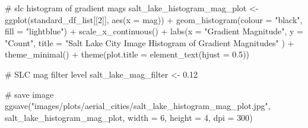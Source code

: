 \documentclass[
  letterpaper,
  DIV=11,
  numbers=noendperiod]{scrreprt}
\newenvironment{Shaded}{\begin{snugshade}}{\end{snugshade}}
\newcommand{\AttributeTok}[1]{\textcolor[rgb]{0.40,0.45,0.13}{#1}}
\newcommand{\CommentTok}[1]{\textcolor[rgb]{0.37,0.37,0.37}{#1}}
\newcommand{\DecValTok}[1]{\textcolor[rgb]{0.68,0.00,0.00}{#1}}
\newcommand{\FloatTok}[1]{\textcolor[rgb]{0.68,0.00,0.00}{#1}}
\newcommand{\FunctionTok}[1]{\textcolor[rgb]{0.28,0.35,0.67}{#1}}
\newcommand{\NormalTok}[1]{\textcolor[rgb]{0.00,0.23,0.31}{#1}}
\newcommand{\OtherTok}[1]{\textcolor[rgb]{0.00,0.23,0.31}{#1}}
\newcommand{\SpecialCharTok}[1]{\textcolor[rgb]{0.37,0.37,0.37}{#1}}
\newcommand{\StringTok}[1]{\textcolor[rgb]{0.13,0.47,0.30}{#1}}
\begin{document}
\begin{Shaded}
\begin{Highlighting}[]
\CommentTok{\# slc histogram of gradient mags}
\NormalTok{salt\_lake\_histogram\_mag\_plot }\OtherTok{\textless{}{-}}
  \FunctionTok{ggplot}\NormalTok{(standard\_df\_list[[}\DecValTok{2}\NormalTok{]], }
         \FunctionTok{aes}\NormalTok{(}\AttributeTok{x =}\NormalTok{ mag)) }\SpecialCharTok{+}
  \FunctionTok{geom\_histogram}\NormalTok{(}\AttributeTok{colour =} \StringTok{"black"}\NormalTok{, }\AttributeTok{fill =} \StringTok{"lightblue"}\NormalTok{) }\SpecialCharTok{+}
  \FunctionTok{scale\_x\_continuous}\NormalTok{() }\SpecialCharTok{+} 
  \FunctionTok{labs}\NormalTok{(}\AttributeTok{x =} \StringTok{"Gradient Magnitude"}\NormalTok{, }
       \AttributeTok{y =} \StringTok{"Count"}\NormalTok{, }
       \AttributeTok{title =} \StringTok{"Salt Lake City Image Histogram of Gradient Magnitudes"}
\NormalTok{       ) }\SpecialCharTok{+}
  \FunctionTok{theme\_minimal}\NormalTok{() }\SpecialCharTok{+}
  \FunctionTok{theme}\NormalTok{(}\AttributeTok{plot.title =} \FunctionTok{element\_text}\NormalTok{(}\AttributeTok{hjust =} \FloatTok{0.5}\NormalTok{))}

\CommentTok{\# SLC mag filter level}
\NormalTok{salt\_lake\_mag\_filter }\OtherTok{\textless{}{-}} \FloatTok{0.12}

\CommentTok{\# save image}
\FunctionTok{ggsave}\NormalTok{(}\StringTok{"images/plots/aerial\_cities/salt\_lake\_histogram\_mag\_plot.jpg"}\NormalTok{, salt\_lake\_histogram\_mag\_plot, }\AttributeTok{width =} \DecValTok{6}\NormalTok{, }\AttributeTok{height =} \DecValTok{4}\NormalTok{, }\AttributeTok{dpi =} \DecValTok{300}\NormalTok{)}
\end{Highlighting}
\end{Shaded}
\end{document}
